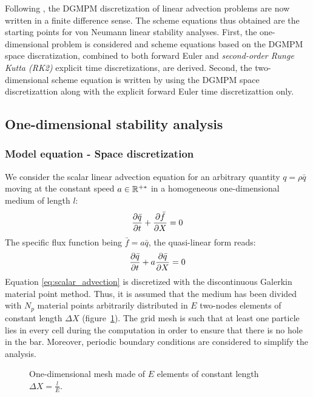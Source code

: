 Following \cite{Hirsch}, the DGMPM discretization of linear advection problems are now written in a finite difference sense. The scheme equations thus obtained are the starting points for von Neumann linear stability analyses. First, the one-dimensional problem is considered and scheme equations based on the DGMPM space discratization, combined to both forward Euler and \textit{second-order Runge Kutta (RK2)} explicit time discretizations, are derived. Second, the two-dimensional scheme equation is written by using the DGMPM space discretizattion along with the explicit forward Euler time discretizattion only.

\subsection{One-dimensional stability analysis}
\subsubsection*{Model equation - Space discretization}
We consider the scalar linear advection equation for an arbitrary quantity $q=\rho \bar{q}$ moving at the constant speed $a \in \mathbb{R}^{+*}$ in a homogeneous one-dimensional medium of length $l$:
\begin{equation}
\frac{\partial \bar{q}}{\partial t} + \frac{\partial \bar{f}}{\partial X} = 0 
\end{equation}
The specific flux function being $\bar{f} = a\bar{q}$, the quasi-linear form reads:
\begin{equation}
\frac{\partial \bar{q}}{\partial t} + a\frac{\partial \bar{q}}{\partial X} = 0 \label{eq:scalar_advection}
\end{equation}
Equation \eqref{eq:scalar_advection} is discretized with the discontinuous Galerkin material point method. Thus, it is assumed that the medium has been divided with $N_p$ material points arbitrarily distributed in $E$ two-nodes elements of constant length $\Delta X$ (figure~\ref{fig:1Dmesh}). The grid mesh is such that at least one particle lies in every cell during the computation in order to ensure that there is no hole in the bar. Moreover, periodic boundary conditions are considered to simplify the analysis.
\begin{figure}[h!]
  \centering

  \caption{One-dimensional mesh made of $E$ elements of constant length $\Delta X = \frac{l}{E}$.}\label{fig:1Dmesh}
\end{figure}

